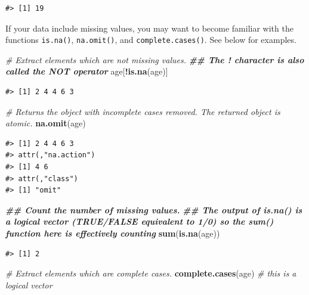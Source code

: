 \documentclass[
]{book}
\newenvironment{Shaded}{\begin{snugshade}}{\end{snugshade}}
\newcommand{\CommentTok}[1]{\textcolor[rgb]{0.56,0.35,0.01}{\textit{#1}}}
\newcommand{\DocumentationTok}[1]{\textcolor[rgb]{0.56,0.35,0.01}{\textbf{\textit{#1}}}}
\newcommand{\FunctionTok}[1]{\textcolor[rgb]{0.13,0.29,0.53}{\textbf{#1}}}
\newcommand{\NormalTok}[1]{#1}
\newcommand{\SpecialCharTok}[1]{\textcolor[rgb]{0.81,0.36,0.00}{\textbf{#1}}}
\begin{document}
\begin{verbatim}
#> [1] 19
\end{verbatim}

If your data include missing values, you may want to become familiar with the
functions \texttt{is.na()}, \texttt{na.omit()}, and \texttt{complete.cases()}. See below for
examples.

\begin{Shaded}
\begin{Highlighting}[]
\CommentTok{\# Extract elements which are not missing values.}
\DocumentationTok{\#\# The ! character is also called the NOT operator}
\NormalTok{age[}\SpecialCharTok{!}\FunctionTok{is.na}\NormalTok{(age)]}
\end{Highlighting}
\end{Shaded}

\begin{verbatim}
#> [1] 2 4 4 6 3
\end{verbatim}

\begin{Shaded}
\begin{Highlighting}[]
\CommentTok{\# Returns the object with incomplete cases removed. The returned object is atomic.}
\FunctionTok{na.omit}\NormalTok{(age)}
\end{Highlighting}
\end{Shaded}

\begin{verbatim}
#> [1] 2 4 4 6 3
#> attr(,"na.action")
#> [1] 4 6
#> attr(,"class")
#> [1] "omit"
\end{verbatim}

\begin{Shaded}
\begin{Highlighting}[]
\DocumentationTok{\#\# Count the number of missing values.}
\DocumentationTok{\#\# The output of is.na() is a logical vector (TRUE/FALSE equivalent to 1/0) so the sum() function here is effectively counting}
\FunctionTok{sum}\NormalTok{(}\FunctionTok{is.na}\NormalTok{(age))}
\end{Highlighting}
\end{Shaded}

\begin{verbatim}
#> [1] 2
\end{verbatim}

\begin{Shaded}
\begin{Highlighting}[]
\CommentTok{\# Extract elements which are complete cases.}
\FunctionTok{complete.cases}\NormalTok{(age) }\CommentTok{\# this is a logical vector}
\end{Highlighting}
\end{Shaded}
\end{document}
